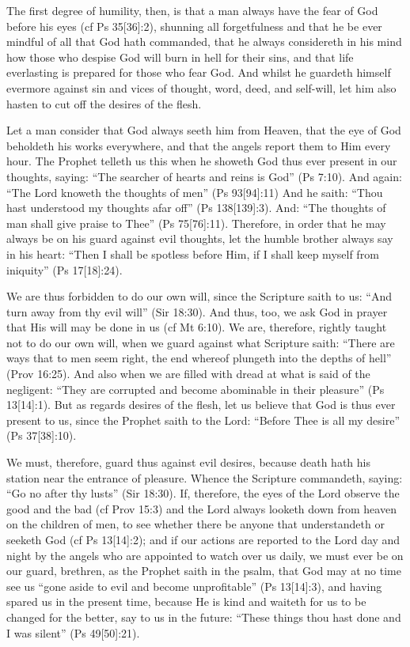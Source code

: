 The first degree of humility, then, is that a man always have the fear of God before his eyes (cf Ps 35[36]:2), shunning all forgetfulness and that he be ever mindful of all that God hath commanded, that he always considereth in his mind how those who despise God will burn in hell for their sins, and that life everlasting is prepared for those who fear God. And whilst he guardeth himself evermore against sin and vices of thought, word, deed, and self-will, let him also hasten to cut off the desires of the flesh.

Let a man consider that God always seeth him from Heaven, that the eye of God beholdeth his works everywhere, and that the angels report them to Him every hour. The Prophet telleth us this when he showeth God thus ever present in our thoughts, saying: ``The searcher of hearts and reins is God'' (Ps 7:10). And again: ``The Lord knoweth the thoughts of men'' (Ps 93[94]:11) And he saith: ``Thou hast understood my thoughts afar off'' (Ps 138[139]:3). And: ``The thoughts of man shall give praise to Thee'' (Ps 75[76]:11). Therefore, in order that he may always be on his guard against evil thoughts, let the humble brother always say in his heart: ``Then I shall be spotless before Him, if I shall keep myself from iniquity'' (Ps 17[18]:24).

We are thus forbidden to do our own will, since the Scripture saith to us: ``And turn away from thy evil will'' (Sir 18:30). And thus, too, we ask God in prayer that His will may be done in us (cf Mt 6:10). We are, therefore, rightly taught not to do our own will, when we guard against what Scripture saith: ``There are ways that to men seem right, the end whereof plungeth into the depths of hell'' (Prov 16:25). And also when we are filled with dread at what is said of the negligent: ``They are corrupted and become abominable in their pleasure'' (Ps 13[14]:1). But as regards desires of the flesh, let us believe that God is thus ever present to us, since the Prophet saith to the Lord: ``Before Thee is all my desire'' (Ps 37[38]:10).

We must, therefore, guard thus against evil desires, because death hath his station near the entrance of pleasure. Whence the Scripture commandeth, saying: ``Go no after thy lusts'' (Sir 18:30). If, therefore, the eyes of the Lord observe the good and the bad (cf Prov 15:3) and the Lord always looketh down from heaven on the children of men, to see whether there be anyone that understandeth or seeketh God (cf Ps 13[14]:2); and if our actions are reported to the Lord day and night by the angels who are appointed to watch over us daily, we must ever be on our guard, brethren, as the Prophet saith in the psalm, that God may at no time see us ``gone aside to evil and become unprofitable'' (Ps 13[14]:3), and having spared us in the present time, because He is kind and waiteth for us to be changed for the better, say to us in the future: ``These things thou hast done and I was silent'' (Ps 49[50]:21).

